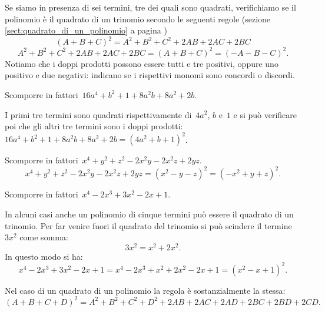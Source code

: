Se siamo in presenza di sei termini, tre dei quali sono quadrati, verifichiamo se il polinomio è il quadrato di un
trinomio secondo le seguenti regole (sezione \ref{sect:quadrato_di_un_polinomio} a pagina \pageref{sect:quadrato_di_un_polinomio})
\begin{equation*}
(A+B+C)^{2}=A^{2}+B^{2}+C^{2}+2AB+2AC+2BC
\end{equation*}
\begin{equation*}
A^{2}+B^{2}+C^{2}+2AB+2AC+2BC=(A+B+C)^{2}=(-A-B-C)^{2}.
\end{equation*}
Notiamo che i doppi prodotti possono essere tutti e tre positivi, oppure uno positivo e due negativi:
indicano se i rispettivi monomi sono concordi o discordi.
\begin{exrig}
 \begin{esempio}
Scomporre in fattori~$16a^{4}+b^{2}+1+8a^{2}b+8a^{2}+2b$.

I primi tre termini sono quadrati rispettivamente di~$4a^{2}$, $b$ e~$1$ e si può verificare poi che gli altri tre termini sono
i doppi prodotti:~$16a^{4}+b^{2}+1+8a^{2}b+8a^{2}+2b=\left(4a^{2}+b+1\right)^{2}$.
 \end{esempio}

 \begin{esempio}
Scomporre in fattori~$x^{4}+y^{2}+z^{2}-2x^{2}y-2x^{2}z+2yz$.
\[x^{4}+y^{2}+z^{2}-2x^{2}y-2x^{2}z+2yz=\left(x^{2}-y-z\right)^{2}=\left(-x^{2}+y+z\right)^{2}.\]
 \end{esempio}

 \begin{esempio}
Scomporre in fattori~$x^{4}-2x^{3}+3x^{2}-2x+1$.

In alcuni casi anche un polinomio di cinque termini può essere il quadrato di un trinomio.
Per far venire fuori il quadrato del trinomio si può scindere il termine~$3x^{2}$ come somma:
\[3x^{2}=x^{2}+2x^{2}.\]
In questo modo si ha:
\[x^{4}-2x^{3}+3x^{2}-2x+1=x^{4}-2x^{3}+x^{2}+2x^{2}-2x+1=(x^{2}-x+1)^{2}.\]
 \end{esempio}
\end{exrig}

Nel caso di un quadrato di un polinomio la regola è sostanzialmente la stessa:
\begin{equation*}
(A+B+C+D)^{2}=A^{2}+B^{2}+C^{2}+D^{2}+2AB+2AC+2AD+2BC+2BD+2CD.
\end{equation*}
\ovalbox{\risolvii \ref{ese:13.45},\ref{ese:13.46},\ref{ese:13.47}, \ref{ese:13.48}, \ref{ese:13.49}, \ref{ese:13.50}}

